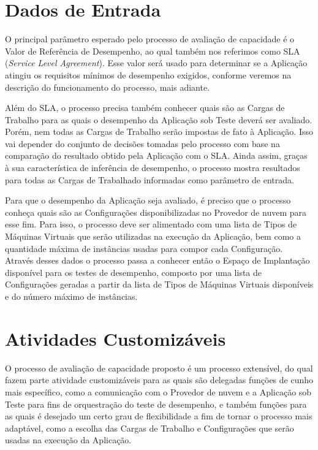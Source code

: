 \section{Dados de Entrada}

O principal parâmetro esperado pelo processo de avaliação de capacidade é o Valor
de Referência de Desempenho, ao qual também nos referimos como SLA 
(\emph{Service Level Agreement}). Esse valor será usado para determinar 
se a Aplicação atingiu os requisitos mínimos de desempenho exigidos, conforme
veremos na descrição do funcionamento do processo, mais adiante.

Além do SLA, o processo precisa também conhecer quais são as Cargas de Trabalho
para as quais o desempenho da Aplicação sob Teste deverá ser avaliado. Porém,
nem todas as Cargas de Trabalho serão impostas de fato à Aplicação. Isso vai 
depender do conjunto de decisões tomadas pelo processo com base na comparação do 
resultado obtido pela Aplicação com o SLA. Ainda assim, graças à sua característica 
de inferência de desempenho, o processo mostra resultados para todas as Cargas de 
Trabalhado informadas como parâmetro de entrada.

Para que o desempenho da Aplicação seja avaliado, é preciso que o processo conheça 
quais são as Configurações disponibilizadas no Provedor de nuvem para esse fim. 
Para isso, o processo deve ser alimentado com uma lista de Tipos de Máquinas Virtuais 
que serão utilizadas na execução da Aplicação, bem como a quantidade máxima de 
instâncias usadas para compor cada Configuração. Através desses dados o processo
passa a conhecer então o Espaço de Implantação disponível para os testes de 
desempenho, composto por uma lista de Configurações geradas a partir da lista de
Tipos de Máquinas Virtuais disponíveis e do número máximo de instâncias.

\section{Atividades Customizáveis}
O processo de avaliação de capacidade proposto é um processo extensível, do qual
fazem parte atividade customizáveis para as quais são delegadas funções de cunho mais
específico, como a comunicação com o Provedor de nuvem e a Aplicação sob Teste
para fins de orquestração do teste de desempenho, e também funções para as quais
é desejado um certo grau de flexibilidade a fim de tornar o processo mais adaptável,
como a escolha das Cargas de Trabalho e Configurações que serão usadas na execução
da Aplicação.

